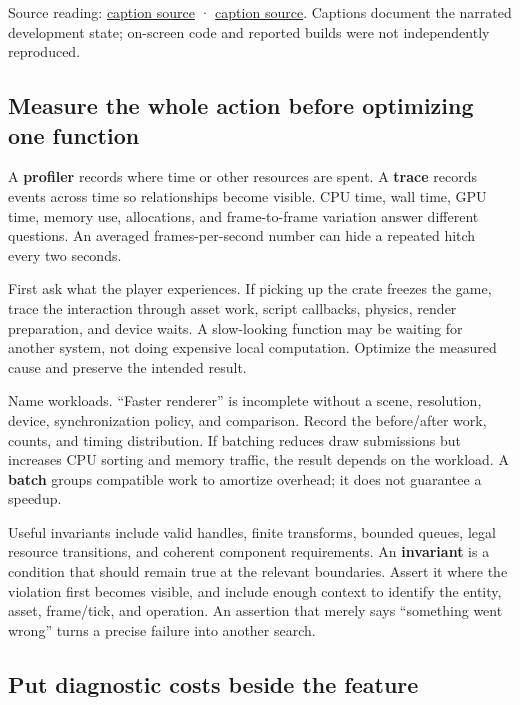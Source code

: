 Source reading: \href{https://www.youtube.com/watch?v=3ZFcvBjRFN0}{caption source} · \href{https://www.youtube.com/watch?v=KanKG-vd9GA}{caption source}. Captions document the narrated development state; on-screen code and reported builds were not independently reproduced.

\subsection{Measure the whole action before optimizing one function}\label{06-engine-ii-ch041-measure-the-whole-action-before-optimizing-one-function}

A \textbf{profiler} records where time or other resources are spent. A \textbf{trace} records events across time so relationships become visible. CPU time, wall time, GPU time, memory use, allocations, and frame-to-frame variation answer different questions. An averaged frames-per-second number can hide a repeated hitch every two seconds.

First ask what the player experiences. If picking up the crate freezes the game, trace the interaction through asset work, script callbacks, physics, render preparation, and device waits. A slow-looking function may be waiting for another system, not doing expensive local computation. Optimize the measured cause and preserve the intended result.

Name workloads. ``Faster renderer'' is incomplete without a scene, resolution, device, synchronization policy, and comparison. Record the before/after work, counts, and timing distribution. If batching reduces draw submissions but increases CPU sorting and memory traffic, the result depends on the workload. A \textbf{batch} groups compatible work to amortize overhead; it does not guarantee a speedup.

Useful invariants include valid handles, finite transforms, bounded queues, legal resource transitions, and coherent component requirements. An \textbf{invariant} is a condition that should remain true at the relevant boundaries. Assert it where the violation first becomes visible, and include enough context to identify the entity, asset, frame/tick, and operation. An assertion that merely says ``something went wrong'' turns a precise failure into another search.

\subsection{Put diagnostic costs beside the feature}\label{06-engine-ii-ch041-put-diagnostic-costs-beside-the-feature}

